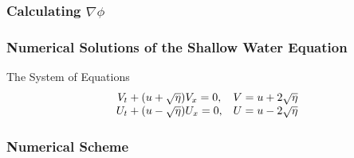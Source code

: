 \documentclass[screen]{beamer}
\begin{document}
\begin{frame}
    \frametitle{Calculating $\nabla \phi$}
\end{frame}

\begin{frame}
	\frametitle{Numerical Solutions of the Shallow Water Equation}
	\begin{block}{The System of Equations}
		\begin{align*}
		\begin{array}{c c}
		V_t + (u+\sqrt{\eta})V_x = 0, & V = u + 2 \sqrt \eta\\
		U_t + (u-\sqrt{\eta})U_x = 0, & U = u - 2\sqrt \eta
		\end{array}
		\end{align*}
	\end{block}
\end{frame}
\begin{frame}
	\frametitle{Numerical Scheme}
\end{frame}
\end{document}
